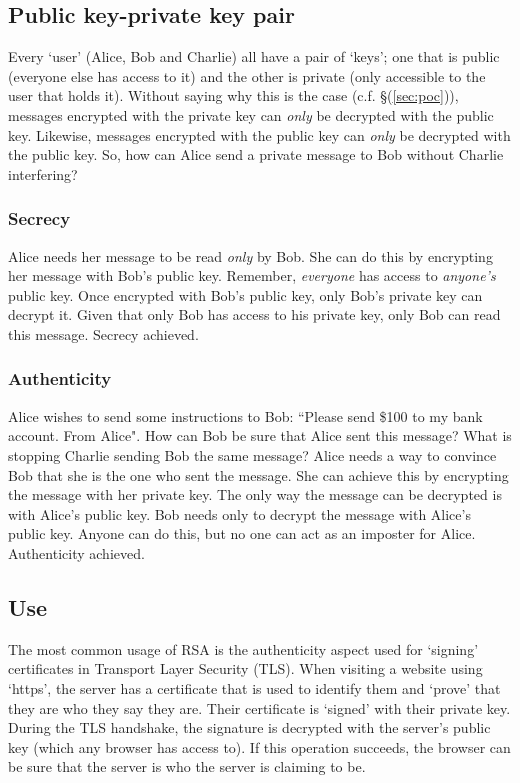 \documentclass[]{scrartcl}
\theoremstyle{definition}
\renewcommand{\sec}[1]{\S \ref{#1}}
\let\oldref\ref
\renewcommand{\ref}[1]{(\oldref{#1})}
\begin{document}
\subsection{Public key-private key pair}
Every `user' (Alice, Bob and Charlie) all have a pair of `keys'; one that is public (everyone else has access to it) and the other is private (only accessible to the user that holds it). Without saying why this is the case (c.f. \sec{sec:poc}), messages encrypted with the private key can \textit{only} be decrypted with the public key. Likewise, messages encrypted with the public key can \textit{only} be decrypted with the public key. So, how can Alice send a private message to Bob without Charlie interfering?
\subsubsection{Secrecy}
Alice needs her message to be read \textit{only} by Bob. She can do this by encrypting her message with Bob's public key. Remember, \textit{everyone} has access to \textit{anyone's} public key. Once encrypted with Bob's public key, only Bob's private key can decrypt it. Given that only Bob has access to his private key, only Bob can read this message. Secrecy achieved.
\subsubsection{Authenticity}
Alice wishes to send some instructions to Bob: ``Please send \$100 to my bank account. From Alice". How can Bob be sure that Alice sent this message? What is stopping Charlie sending Bob the same message? Alice needs a way to convince Bob that she is the one who sent the message. She can achieve this by encrypting the message with her private key. The only way the message can be decrypted is with Alice's public key. Bob needs only to decrypt the message with Alice's public key. Anyone can do this, but no one can act as an imposter for Alice. Authenticity achieved.
\subsection{Use}
The most common usage of RSA is the authenticity aspect used for `signing' certificates in Transport Layer Security (TLS). When visiting a website using `https', the server has a certificate that is used to identify them and `prove' that they are who they say they are. Their certificate is `signed' with their private key. During the TLS handshake, the signature is decrypted with the server's public key (which any browser has access to). If this operation succeeds, the browser can be sure that the server is who the server is claiming to be.
\end{document}

